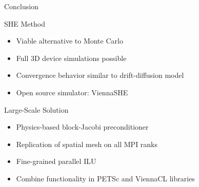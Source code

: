 \documentclass[usepdftitle=false,handout,10pt]{beamer}
\begin{document}
\begin{frame}{Conclusion}

  \begin{block}{SHE Method}
   \begin{itemize}
    \item Viable alternative to Monte Carlo
    \item Full 3D device simulations possible
    \item Convergence behavior similar to drift-diffusion model
    \item Open source simulator: ViennaSHE
   \end{itemize}
  \end{block}
  
  \pause
  
  \begin{block}{Large-Scale Solution}
   \begin{itemize}
    \item Physics-based block-Jacobi preconditioner
    \item Replication of spatial mesh on all MPI ranks
    \item Fine-grained parallel ILU
    \item Combine functionality in PETSc and ViennaCL libraries
   \end{itemize}
  \end{block}
  
\end{frame}
\end{document}
